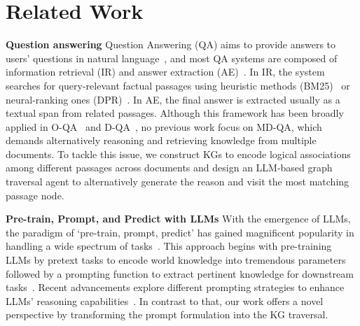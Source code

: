 \section{Related Work}
\textbf{Question answering} 
Question Answering (QA) aims to provide answers to users' questions in natural language~\cite{zhu2021retrieving, pandya2021question}, and most QA systems are composed of information retrieval (IR) and answer extraction (AE)~\cite{mao2021rider, ju2022grape, liu2022heterogeneous}. In IR, the system searches for query-relevant factual passages using heuristic methods (BM25)~\cite{robertson2009probabilistic} or neural-ranking ones (DPR)~\cite{karpukhin2020dense}. In AE, the final answer is extracted usually as a textual span from related passages. Although this framework has been broadly applied in O-QA~\cite{mao2021rider} and D-QA~\cite{xu2020layoutlmv2, mathew2021docvqa}, no previous work focus on MD-QA, which demands alternatively reasoning and retrieving knowledge from multiple documents. To tackle this issue, we construct KGs to encode logical associations among different passages across documents and design an LLM-based graph traversal agent to alternatively generate the reason and visit the most matching passage node.


\noindent\textbf{Pre-train, Prompt, and Predict with LLMs}
With the emergence of LLMs, the paradigm of `pre-train, prompt, predict' has gained magnificent popularity in handling a wide spectrum of tasks~\cite{gururangan2020don, liu2023pre, yu2023large}. This approach begins with pre-training LLMs by pretext tasks to encode world knowledge into tremendous parameters~\cite{wu2023survey} followed by a prompting function to extract pertinent knowledge for downstream tasks~\cite{yang2023harnessing}. Recent advancements explore different prompting strategies to enhance LLMs' reasoning capabilities~\cite{wei2022chain, jin2023large}. In contrast to that, our work offers a novel perspective by transforming the prompt formulation into the KG traversal. 



